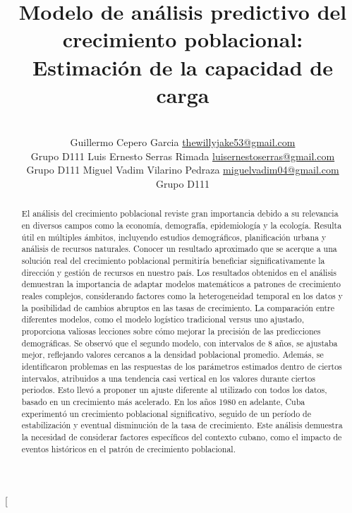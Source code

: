 \documentclass[a4paper,10pt,twocolumn]{article}
\title{Modelo de análisis predictivo del crecimiento poblacional: Estimación de la capacidad de carga}
\author{\\
\name Guillermo Cepero Garcia \email \href{mailto:thewillyjake53@gmail.com}{thewillyjake53@gmail.com}
	\\ \addr Grupo D111 \AND
\name Luis Ernesto Serras Rimada \email \href{mailto:luisernestoserras@gmail.com}{luisernestoserras@gmail.com}
  \\ \addr Grupo D111 \AND
\name Miguel Vadim Vilarino Pedraza \email \href{mailto:miguelvadim04@gmail.com}{miguelvadim04@gmail.com}
	\\ \addr Grupo D111}
\begin{document}
\twocolumn[

\maketitle


\begin{abstract}

	El análisis del crecimiento poblacional reviste gran importancia debido a su relevancia en diversos campos como la economía, demografía, epidemiología y la ecología. Resulta útil en múltiples ámbitos, incluyendo estudios demográficos, planificación urbana y análisis de recursos naturales. Conocer un resultado aproximado que se acerque a una solución real del crecimiento poblacional permitiría beneficiar significativamente la dirección y gestión de recursos en nuestro país. Los resultados obtenidos en el análisis demuestran la importancia de adaptar modelos matemáticos a patrones de crecimiento reales complejos, considerando factores como la heterogeneidad temporal en los datos y la posibilidad de cambios abruptos en las tasas de crecimiento. La comparación entre diferentes modelos, como el modelo logístico tradicional versus uno ajustado, proporciona valiosas lecciones sobre cómo mejorar la precisión de las predicciones demográficas. Se observó que el segundo modelo, con intervalos de 8 años, se ajustaba mejor, reflejando valores cercanos a la densidad poblacional promedio. Además, se identificaron problemas en las respuestas de los parámetros estimados dentro de ciertos intervalos, atribuidos a una tendencia casi vertical en los valores durante ciertos periodos. Esto llevó a proponer un ajuste diferente al utilizado con todos los datos, basado en un crecimiento más acelerado. En los años 1980 en adelante, Cuba experimentó un crecimiento poblacional significativo, seguido de un período de estabilización y eventual disminución de la tasa de crecimiento. Este análisis demuestra la necesidad de considerar factores específicos del contexto cubano, como el impacto de eventos históricos en el patrón de crecimiento poblacional.

\end{abstract}
\end{document}
